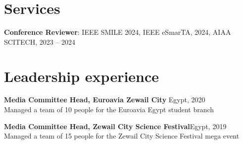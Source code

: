 \documentclass[10pt]{article}
\begin{document}
\section{Services}\label{sec:services}
\textbf{Conference Reviewer}: IEEE SMILE 2024, IEEE eSmarTA, 2024, AIAA SCITECH, 2023 – 2024

\section{Leadership experience}\label{sec:leadership-experience}
\textbf{Media Committee Head, Euroavia Zewail City} \hfill Egypt, 2020\\
Managed a team of 10 people for the Euroavia Egypt student branch

\textbf{Media Committee Head, Zewail City Science Festival}\hfill Egypt, 2019\\
Managed a team of 15 people for the Zewail City Science Festival mega event
\end{document}
